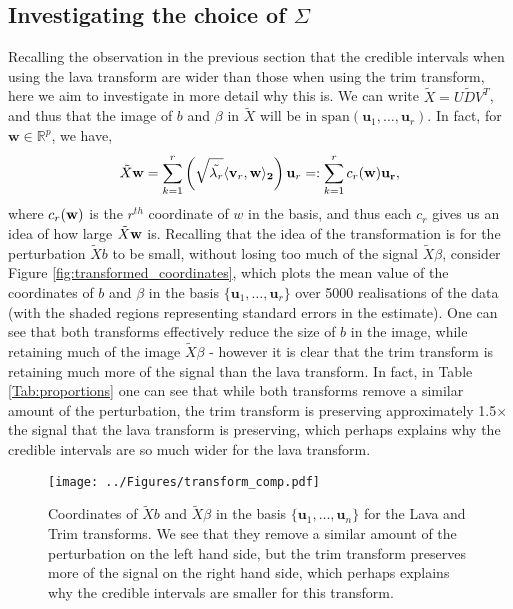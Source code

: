 \documentclass[11pt]{article}
\newcommand{\R}{\mathbb{R}}
\newcommand{\Span}{\textrm{span}}
\numberwithin{equation}{section}
\begin{document}
\subsection{Investigating the choice of $\Sigma$}\label{sec:Sigma_choice}
Recalling the observation in the previous section that the credible intervals when using the lava transform are wider than those when using the trim transform, here we aim to investigate in more detail why this is. We can write $\tilde{X} = U \tilde{D} V^T$, and thus that the image of $b$ and $\beta$ in $\tilde{X}$ will be in $\Span(\mathbf{u}_1, \dots, \mathbf{u}_r)$. In fact, for $\mathbf{w} \in \R^p$, we have,
$$
\tilde{X} \mathbf{w} = \sum_{k = 1}^r \left(\sqrt{\tilde{\lambda_r}}\langle \mathbf{v}_r, \bf{w}\rangle_2\right)\mathbf{u}_r =: \sum_{k = 1}^r c_r(\bf{w}) \mathbf{u}_r,
$$
where $c_r(\bf{w})$ is the $r^{th}$ coordinate of $w$ in the basis, and thus each $c_r$ gives us an idea of how large $\tilde{X} \bf{w}$ is. Recalling that the idea of the transformation is for the perturbation $\tilde{X} b$ to be small, without losing too much of the signal $\tilde{X} \beta$, consider Figure \ref{fig:transformed_coordinates}, which plots the mean value of the coordinates of $b$ and $\beta$ in the basis $\{\mathbf{u}_1, \dots, \mathbf{u}_r\}$ over 5000 realisations of the data (with the shaded regions representing standard errors in the estimate).  One can see that both transforms effectively reduce the size of $b$ in the image, while retaining much of the image $\tilde{X}\beta$ - however it is clear that the trim transform is retaining much more of the signal than the lava transform. In fact, in Table \ref{Tab:proportions} one can see that while both transforms remove a similar amount of the perturbation, the trim transform is preserving approximately 1.5$\times$ the signal that the lava transform is preserving, which perhaps explains why the credible intervals are so much wider for the lava transform.

\begin{figure}[h]
\centering
  \texttt{[image: ../Figures/transform\_comp.pdf]}
  \caption{Coordinates of $\tilde{X}b$ and $\tilde{X}\beta$ in the basis $\{\mathbf{u}_1, \dots, \mathbf{u}_n\}$ for the Lava and Trim transforms. We see that they remove a similar amount of the perturbation on the left hand side, but the trim transform preserves more of the signal on the right hand side, which perhaps explains why the credible intervals are smaller for this transform.}
\end{figure}
\end{document}

